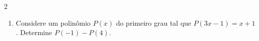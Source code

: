 \documentclass[a4paper,14pt]{article}
\begin{document}
\begin{multicols}{2}
\begin{enumerate}
\begin{enumerate}[a)]
            	\item $(B(-1))^2 - (B(0))^2$\\\\\\\\\\\\\\\\\\\\\\
            	\item $\frac{B(2) + B(3) - B(4)}{B(0)}$\\\\\\\\\\\\\\\\\\\\\\\\
            \end{enumerate}
            \item Considere um polinômio $P(x)$ do primeiro grau tal que $P(3x - 1) = x + 1$. Determine $P(-1)-P(4)$.
    	\end{enumerate}
    $~$ \\ $~$ \\ $~$ \\ $~$ \\ $~$ \\ $~$ \\ $~$ \\ $~$ \\ $~$ \\ $~$ \\ $~$ \\ $~$ \\ $~$ \\ $~$ \\ $~$ \\ $~$ \\ $~$ \\ $~$ \\ $~$ \\ $~$ \\ $~$ \\ $~$ \\ $~$ \\ $~$ \\ $~$ \\ $~$ \\ $~$ \\ $~$ \\ $~$ \\ $~$ \\ $~$ \\ $~$ \\ $~$ \\ $~$ \\ $~$ \\ $~$ \\ $~$ \\
    \end{multicols}
\end{document}
